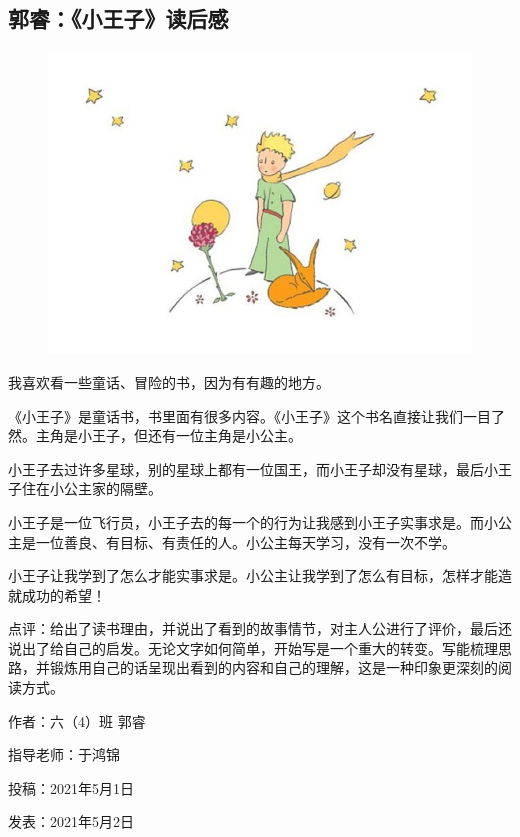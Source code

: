 \vspace{10pt}

{\centering\subsection*{郭睿：《小王子》读后感}}


\renewcommand{\leftmark}{郭睿：《小王子》读后感}

\begin{figure}[htbp]

\centering

\includegraphics[width = .5\textwidth]{./ch/31.jpg}

\end{figure}





我喜欢看一些童话、冒险的书，因为有有趣的地方。

《小王子》是童话书，书里面有很多内容。《小王子》这个书名直接让我们一目了然。主角是小王子，但还有一位主角是小公主。

小王子去过许多星球，别的星球上都有一位国王，而小王子却没有星球，最后小王子住在小公主家的隔壁。

小王子是一位飞行员，小王子去的每一个的行为让我感到小王子实事求是。而小公主是一位善良、有目标、有责任的人。小公主每天学习，没有一次不学。

小王子让我学到了怎么才能实事求是。小公主让我学到了怎么有目标，怎样才能造就成功的希望！

点评：给出了读书理由，并说出了看到的故事情节，对主人公进行了评价，最后还说出了给自己的启发。无论文字如何简单，开始写是一个重大的转变。写能梳理思路，并锻炼用自己的话呈现出看到的内容和自己的理解，这是一种印象更深刻的阅读方式。





\vspace{10pt}



作者：六（4）班 郭睿

指导老师：于鸿锦

投稿：2021年5月1日

发表：2021年5月2日


                



\vspace{10pt}

\hline



